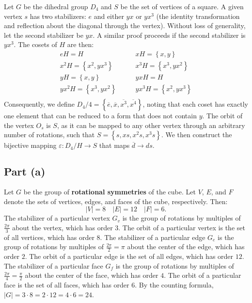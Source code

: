 \documentclass{article}
\begin{document}
\clearpage

Let $G$ be the dihedral group $D_4$ and $S$ be the set of vertices of a square. A given vertex $s$ has two stabilizers: $e$ and either $yx$ or $yx^3$ (the identity transformation and reflection about the diagonal through the vertex). Without loss of generality, let the second stabilizer be $yx$. A similar proof proceeds if the second stabilizer is $yx^3$. The cosets of $H$ are then:
\begin{equation}
    \begin{split}
        eH = H \quad & \quad xH = \left\{x, y\right\} \\
        x^2H = \left\{x^2, yx^3\right\} \quad & \quad x^3H = \left\{x^3, yx^2\right\} \\
        yH = \left\{x, y\right\} \quad & \quad yxH = H \\
        yx^2H = \left\{x^3, yx^2\right\} \quad & \quad yx^3H = \left\{x^2, yx^3\right\} \\
    \end{split}
\end{equation}
Consequently, we define $D_4 / 4 = \left\{\overline{e}, \overline{x}, \overline{x^3}, \overline{x^4}\right\}$, noting that each coset has exactly one element that can be reduced to a form that does not contain $y$. The orbit of the vertex $O_s$ is $S$, as it can be mapped to any other vertex through an arbitrary number of rotations,  such that $S = \left\{s, xs, x^2s, x^3s\right\}$. We then construct the bijective mapping $\varepsilon : D_4 / H \to S$ that maps $\overline{d} \to ds$.

\clearpage

\subsection*{Part (a)}
Let $G$ be the group of \textbf{rotational symmetries} of the cube. Let $V$, $E$, and $F$ denote the sets of vertices, edges, and faces of the cube, respectively. Then:
\begin{equation}
    \left|V\right| = 8 \quad \left|E\right| = 12 \quad \left|F\right| = 6.
\end{equation}
The stabilizer of a particular vertex $G_v$ is the group of rotations by multiples of $\frac{2\pi}{3}$ about the vertex, which has order $3$. The orbit of a particular vertex is the set of all vertices, which has order $8$. The stabilizer of a particular edge $G_e$ is the group of rotations by multiples of $\frac{2\pi}{2} = \pi$ about the center of the edge, which has order $2$. The orbit of a particular edge is the set of all edges, which has order $12$. The stabilizer of a particular face $G_f$ is the group of rotations by multiples of $\frac{2\pi}{4} = \frac{\pi}{2}$ about the center of the face, which has order $4$. The orbit of a particular face is the set of all faces, which has order $6$. By the counting formula, $\left|G\right| = 3 \cdot 8 = 2 \cdot 12 = 4 \cdot 6 = 24$.
\end{document}
